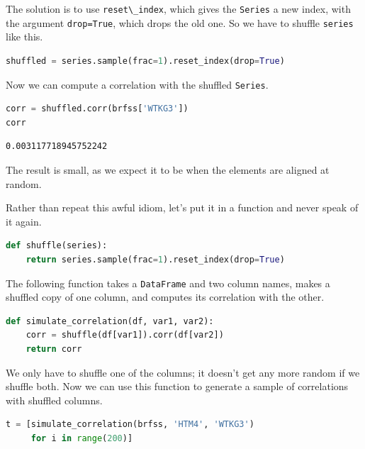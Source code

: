 The solution is to use \passthrough{\lstinline!reset\_index!}, which
gives the \passthrough{\lstinline!Series!} a new index, with the
argument \passthrough{\lstinline!drop=True!}, which drops the old one.
So we have to shuffle \passthrough{\lstinline!series!} like this.

\begin{lstlisting}[language=Python,style=source]
shuffled = series.sample(frac=1).reset_index(drop=True)
\end{lstlisting}

Now we can compute a correlation with the shuffled
\passthrough{\lstinline!Series!}.

\begin{lstlisting}[language=Python,style=source]
corr = shuffled.corr(brfss['WTKG3'])
corr
\end{lstlisting}

\begin{lstlisting}[style=output]
0.003117718945752242
\end{lstlisting}

The result is small, as we expect it to be when the elements are aligned
at random.

Rather than repeat this awful idiom, let's put it in a function and
never speak of it again.

\begin{lstlisting}[language=Python,style=source]
def shuffle(series):
    return series.sample(frac=1).reset_index(drop=True)
\end{lstlisting}

The following function takes a \passthrough{\lstinline!DataFrame!} and
two column names, makes a shuffled copy of one column, and computes its
correlation with the other.

\begin{lstlisting}[language=Python,style=source]
def simulate_correlation(df, var1, var2):
    corr = shuffle(df[var1]).corr(df[var2])
    return corr
\end{lstlisting}

We only have to shuffle one of the columns; it doesn't get any more
random if we shuffle both. Now we can use this function to generate a
sample of correlations with shuffled columns.

\begin{lstlisting}[language=Python,style=source]
t = [simulate_correlation(brfss, 'HTM4', 'WTKG3')
     for i in range(200)]
\end{lstlisting}

